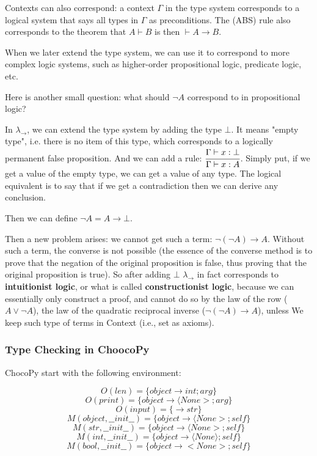 \documentclass[a4paper]{exam}
\begin{document}
\begin{enumerate}
Contexts can also correspond: a context $\Gamma$ in the type system corresponds to a logical system that says all types in $\Gamma$ as preconditions. The (ABS) rule also corresponds to the theorem that $A\vdash B$ is then $\vdash A\to B$.

When we later extend the type system, we can use it to correspond to more complex logic systems, such as higher-order propositional logic, predicate logic, etc.

Here is another small question: what should $\lnot A$ correspond to in propositional logic?

In $\lambda_\to$, we can extend the type system by adding the type $\bot$. It means "empty type", i.e. there is no item of this type, which corresponds to a logically permanent false proposition. And we can add a rule: $\cfrac{\Gamma\vdash x:\bot}{\Gamma\vdash x:A}$. Simply put, if we get a value of the empty type, we can get a value of any type. The logical equivalent is to say that if we get a contradiction then we can derive any conclusion.

Then we can define $\lnot A=A\to\bot$.

Then a new problem arises: we cannot get such a term: $\lnot(\lnot A)\to A$. Without such a term, the converse is not possible (the essence of the converse method is to prove that the negation of the original proposition is false, thus proving that the original proposition is true). So after adding $\bot$ $\lambda_\to$ in fact corresponds to \textbf{intuitionist logic}, or what is called \textbf{constructionist logic}, because we can essentially only construct a proof, and cannot do so by the law of the row ($A\lor\lnot A$), the law of the quadratic reciprocal inverse ($\lnot(\lnot A)\to A$), unless We keep such type of terms in Context (i.e., set as axioms).

\subsubsection{Type Checking in ChoocoPy}
ChocoPy start with the following environment:

$$O( len )=\{ object \rightarrow int ; arg \}$$
$$O( print )=\{ object \rightarrow\langle None >; arg \}$$
$$O( input )=\{\rightarrow str \}$$
$$M( object,\_\_init\_\_ )=\{ object \rightarrow\langle None >; self \}$$
$$M( str,\_\_init\_\_ )=\{ object \rightarrow\langle None >; self \}$$
$$M( int,\_\_init\_\_ )=\{ object \rightarrow\langle None \rangle; self \}$$
$$M( bool,\_\_init\_\_ )=\{ object \rightarrow< None >; self \}$$


\end{enumerate}
\end{document}
